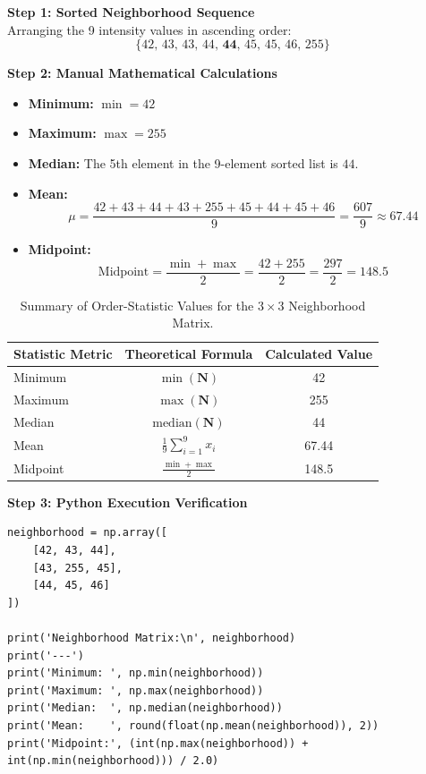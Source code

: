 \documentclass[12pt]{article}
\begin{document}
\textbf{Step 1: Sorted Neighborhood Sequence}\\
Arranging the 9 intensity values in ascending order:
\begin{equation}
\{ 42,\, 43,\, 43,\, 44,\, \mathbf{44},\, 45,\, 45,\, 46,\, 255 \}
\end{equation}

\textbf{Step 2: Manual Mathematical Calculations}
\begin{itemize}
    \setlength\itemsep{0pt}
    \item \textbf{Minimum:} $\min = 42$
    \item \textbf{Maximum:} $\max = 255$
    \item \textbf{Median:} The 5th element in the 9-element sorted list is $44$.
    \item \textbf{Mean:}
    \begin{equation}
    \mu = \frac{42 + 43 + 44 + 43 + 255 + 45 + 44 + 45 + 46}{9} = \frac{607}{9} \approx 67.44
    \end{equation}
    \item \textbf{Midpoint:}
    \begin{equation}
    \text{Midpoint} = \frac{\min + \max}{2} = \frac{42 + 255}{2} = \frac{297}{2} = 148.5
    \end{equation}
\end{itemize}

\begin{table}[H]
\centering
\begin{tabular}{|l|c|c|}
\hline
\textbf{Statistic Metric} & \textbf{Theoretical Formula} & \textbf{Calculated Value} \\ \hline
Minimum & $\min(\mathbf{N})$ & 42 \\ \hline
Maximum & $\max(\mathbf{N})$ & 255 \\ \hline
Median & $\text{median}(\mathbf{N})$ & 44 \\ \hline
Mean & $\frac{1}{9}\sum_{i=1}^9 x_i$ & 67.44 \\ \hline
Midpoint & $\frac{\min + \max}{2}$ & 148.5 \\ \hline
\end{tabular}
\caption{Summary of Order-Statistic Values for the $3\times3$ Neighborhood Matrix.}
\label{tab:order_stats}
\end{table}

\textbf{Step 3: Python Execution Verification}
\begin{lstlisting}[style=code]
neighborhood = np.array([
    [42, 43, 44],
    [43, 255, 45],
    [44, 45, 46]
])

print('Neighborhood Matrix:\n', neighborhood)
print('---')
print('Minimum: ', np.min(neighborhood))
print('Maximum: ', np.max(neighborhood))
print('Median:  ', np.median(neighborhood))
print('Mean:    ', round(float(np.mean(neighborhood)), 2))
print('Midpoint:', (int(np.max(neighborhood)) + int(np.min(neighborhood))) / 2.0)
\end{lstlisting}
\end{document}
